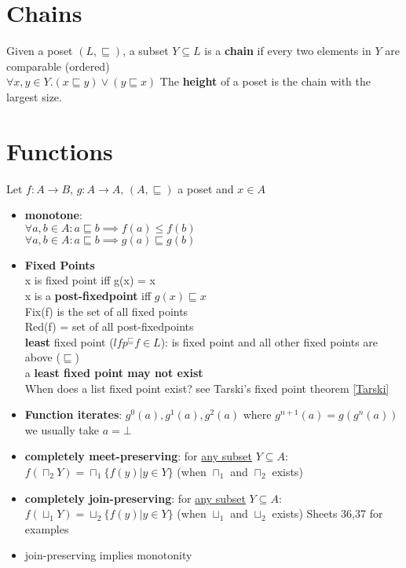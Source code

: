 \section{Chains}
Given a poset $(L,\sqsubseteq)$, a subset $Y \subseteq L$ is a \textbf{chain} if every two elements in $Y$ are comparable (ordered) \\
$\forall {x,y} \in Y . (x \sqsubseteq y) \lor (y \sqsubseteq x)$
The \textbf{height} of a poset is the chain with the largest size.

\section{Functions}
Let $f: A \to B$, $g: A \to A$, $(A, \sqsubseteq)$ a poset and $x \in A$
\begin{itemize}
\item \textbf{monotone}: \\ 
$\forall a,b \in A: a \sqsubseteq b \implies f(a) \leq f(b)	$ \\
$\forall a,b \in A: a \sqsubseteq b \implies g(a) \sqsubseteq g(b)$
\item \textbf{Fixed Points} \\
x is fixed point iff g(x) = x \\
x is a \textbf{post-fixedpoint} iff $g(x) \sqsubseteq x$ \\
Fix(f) is the set of all fixed points \\
Red(f) = set of all post-fixedpoints \\
\textbf{least} fixed point ($lfp^{\sqsubseteq}f \in L$): is fixed point and all other fixed points are above ($\sqsubseteq$) \\ 
a \textbf{least fixed point may not exist} \\
When does a list fixed point exist? see Tarski's fixed point theorem \ref{Tarski}
\item \textbf{Function iterates}: $g^0(a), g^1(a), g^2(a)$ where $g^{n+1}(a) = g(g^n(a))$ we usually take $a=\bot$
\item \textbf{completely meet-preserving}: for \underline{any subset} $Y \subseteq A$: $f(\sqcap_2 Y) = \sqcap_1\{f(y)|y \in Y\}$ (when $\sqcap_1$ and $\sqcap_2$ exists)
\item \textbf{completely join-preserving}: for \underline{any subset} $Y \subseteq A$: $f(\sqcup_1 Y) = \sqcup_2\{f(y)|y \in Y\}$ (when $\sqcup_1$ and $\sqcup_2$ exists) Sheets 36,37 for examples
\item join-preserving implies monotonity 
\end{itemize}

